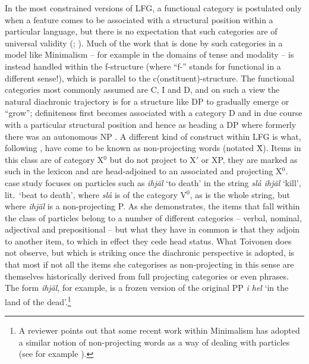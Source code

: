 \documentclass[output=paper]{langsci/langscibook}
\begin{document}
In the most constrained versions of \gls{LFG}, a functional category is
postulated only when a feature comes to be associated with a structural
position within a particular language, but there is no expectation that such
categories are of universal validity (\citealt[6--7]{Kroeger:1993};
\citealt{BoPaChi99}). Much of the work that is done by such categories in a
model like Minimalism -- for example in the domains of tense and modality --
is instead handled within the f-structure (where \enquote{f-} stands for
functional in a different sense!), which is parallel to the
c(onstituent)-structure. The functional categories most commonly assumed are C,
I and D, and on such a view the natural diachronic trajectory is for a
structure like DP to gradually emerge or ``grow'';  definiteness first becomes
associated with a category D and in due course with a particular structural
position and hence as heading a DP where formerly there was an autonomous NP
\citep{Borjarsetal16}. A different kind of construct within
\gls{LFG} is what, following \cite{Toivonen03},
have come to be known as non-projecting words (notated \^{X}). Items in this
class are of category X$^0$ but do not project to X$'$ or XP, they are marked
as such in the lexicon and are head-adjoined to an associated
and projecting X$^0$.  case study focuses on 
particles such as \emph{ihj\"al} `to death' in the string \emph{sl\aa{}
ihj\"al} `kill', lit.\ `beat to death', where \emph{sl\aa} is of the
category V$^0$, as is the whole string, but where \emph{ihj\"al} is a
non-projecting P.  As she demonstrates, the items that fall within the class of
particles belong to a number of different categories -- verbal, nominal,
adjectival and prepositional --  but what they have in common is that they
adjoin to another item, to which in effect they cede head status.  What
Toivonen does not observe, but which is striking once the diachronic
perspective is adopted, is that most if not all the items she categorises as
non-projecting in this sense are themselves historically derived from full
projecting categories or even phrases. The form \emph{ihj\"al}, for example, is
a frozen version of the original PP \emph{i hel} `in the land of the
dead'.\footnote{A reviewer points out that some recent work within Minimalism
    has adopted a similar notion of non-projecting words as a way of dealing
with particles (see for example \citealt{Biberauer2017c}).}
\end{document}
